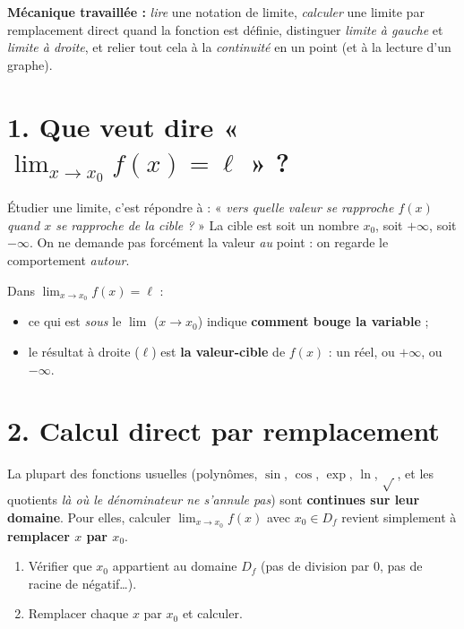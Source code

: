 \documentclass[11pt,a4paper]{article}
\begin{document}
\begin{tcolorbox}[boxbase,colback=primary!12,colframe=primary,
   title={\Large Thème 1 — Notations, lecture graphique \& calcul direct}]
\textbf{Mécanique travaillée :} \emph{lire} une notation de limite, \emph{calculer} une limite
par remplacement direct quand la fonction est définie, distinguer \emph{limite à gauche} et
\emph{limite à droite}, et relier tout cela à la \emph{continuité} en un point (et à la lecture
d'un graphe).
\end{tcolorbox}

\section{1. Que veut dire « $\displaystyle\lim_{x\to x_0} f(x)=\ell$ » ?}

Étudier une limite, c'est répondre à : « \emph{vers quelle valeur se rapproche $f(x)$ quand $x$
se rapproche de la cible ?} » La cible est soit un nombre $x_0$, soit $+\infty$, soit $-\infty$.
On ne demande pas forcément la valeur \emph{au} point : on regarde le comportement \emph{autour}.

\begin{idee}
Dans $\displaystyle\lim_{x\to x_0} f(x)=\ell$ :
\begin{itemize}[leftmargin=1.6em,topsep=2pt,itemsep=1pt]
  \item ce qui est \emph{sous} le $\lim$ ($x\to x_0$) indique \textbf{comment bouge la variable} ;
  \item le résultat à droite ($\ell$) est \textbf{la valeur-cible} de $f(x)$ : un réel, ou $+\infty$, ou $-\infty$.
\end{itemize}
\end{idee}

\section{2. Calcul direct par remplacement}

La plupart des fonctions usuelles (polynômes, $\sin$, $\cos$, $\exp$, $\ln$, $\sqrt{\,}$, et les
quotients \emph{là où le dénominateur ne s'annule pas}) sont \textbf{continues sur leur domaine}.
Pour elles, calculer $\displaystyle\lim_{x\to x_0} f(x)$ avec $x_0\in D_f$ revient simplement à
\textbf{remplacer $x$ par $x_0$}.

\begin{methode}
\begin{enumerate}[leftmargin=1.9em,topsep=2pt,itemsep=1pt]
  \item Vérifier que $x_0$ appartient au domaine $D_f$ (pas de division par $0$, pas de racine de négatif\dots).
  \item Remplacer chaque $x$ par $x_0$ et calculer.
\end{enumerate}
\end{methode}
\end{document}
